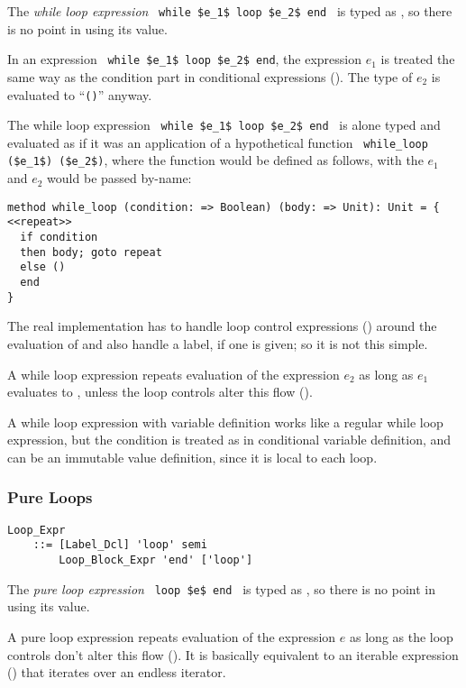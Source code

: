 The {\em while loop expression} ~\lstinline!while $e_1$ loop $e_2$ end!~ is typed as , so there is no point in using its value. 

In an expression ~\lstinline!while $e_1$ loop $e_2$ end!, the expression $e_1$ is treated the same way as the condition part in conditional expressions (). The type of $e_2$ is evaluated to ``\lstinline!()!'' anyway.

The while loop expression ~\lstinline!while $e_1$ loop $e_2$ end!~ is alone typed and evaluated as if it was an application of a hypothetical function ~\lstinline!while_loop ($e_1$) ($e_2$)!, where the function  would be defined as follows, with the $e_1$ and $e_2$ would be passed by-name: 
\begin{lstlisting}
method while_loop (condition: => Boolean) (body: => Unit): Unit = {
<<repeat>>
  if condition 
  then body; goto repeat 
  else ()
  end
}
\end{lstlisting}
The real implementation has to handle loop control expressions () around the evaluation of  and also handle a label, if one is given; so it is not this simple. 

A while loop expression repeats evaluation of the expression $e_2$ as long as $e_1$ evaluates to , unless the loop controls alter this flow ().

A while loop expression with variable definition works like a regular while loop expression, but the condition is treated as in conditional variable definition, and can be an immutable value definition, since it is local to each loop. 





\subsubsection{Pure Loops}
\label{sec:pure-loops}

\grammar\begin{lstlisting}
Loop_Expr 
    ::= [Label_Dcl] 'loop' semi 
        Loop_Block_Expr 'end' ['loop']
\end{lstlisting}

The {\em pure loop expression} ~\lstinline!loop $e$ end!~ is typed as , so there is no point in using its value. 

A pure loop expression repeats evaluation of the expression $e$ as long as the loop controls don't alter this flow (). It is basically equivalent to an iterable expression () that iterates over an endless iterator. 

